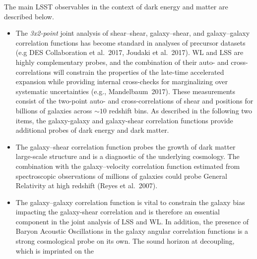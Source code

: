 The main LSST observables in the context of dark energy and matter are described below.

\begin{itemize}
\item The {\sl 3x2-point} joint analysis of shear--shear, galaxy--shear, and galaxy--galaxy
correlation functions has become standard in analyses of precursor datasets (e.g DES Collaboration
et al.~2017, Joudaki et al.~2017). WL and LSS are highly complementary probes, and the combination
of their auto- and cross-correlations will constrain the properties of the late-time accelerated expansion while providing
internal cross-checks for marginalizing over systematic uncertainties (e.g., Mandelbaum~2017).
These measurements consist of the two-point auto- and cross-correlations of shear and positions for billions of galaxies across $\sim 10$ redshift bins.
As described in the following two items, the galaxy-galaxy and galaxy-shear correlation functions provide additional probes of dark energy and dark matter.
%
%
\item The galaxy--shear correlation function probes the growth of dark matter large-scale structure and is a
diagnostic of the underlying cosmology. The combination with the
galaxy--velocity correlation function estimated from spectroscopic observations of millions of galaxies
could probe General Relativity at high redshift (Reyes et al.~2007).
%
\item The galaxy--galaxy correlation function is vital to constrain the galaxy bias impacting the galaxy-shear correlation and is therefore
an essential component in the joint analysis of LSS and WL. In addition, the presence of 
Baryon Acoustic Oscillations in the galaxy angular correlation functions is a strong cosmological
probe on its own. The sound horizon at decoupling, which is imprinted on the

\end{itemize}
